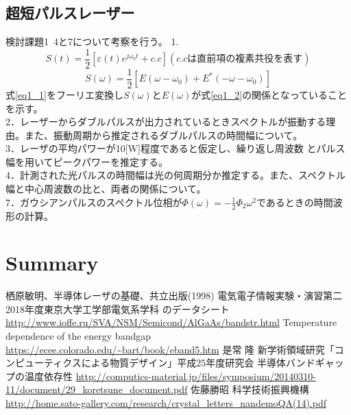 \documentclass[titlepage]{jsarticle}
\begin{document}
\subsection{超短パルスレーザー}
検討課題1~4と7について考察を行う。
1.
\begin{equation}
    S(t)=\frac{1}{2}[\varepsilon(t)e^{j\omega_0 t}+c.c](c.cは直前項の複素共役を表す)
    \label{eq1_1}
\end{equation}
\begin{equation}
    S(\omega)=\frac{1}{2}[E(\omega-\omega_0)+E^{*}(-\omega-\omega_0)]
    \label{eq1_2}
\end{equation}
式\ref{eq1_1}をフーリエ変換し$S(\omega)とE(\omega)$が式\ref{eq1_2}の関係となっていることを示す。\\
2．レーザーからダブルパルスが出力されているときスペクトルが振動する理由。また、振動周期から推定されるダブルパルスの時間幅について。\\
3．レーザの平均パワーが10[W]程度であると仮定し、繰り返し周波数
とパルス幅を用いてピークパワーを推定する。\\
4．計測された光パルスの時間幅は光の何周期分か推定する。また、スペクトル幅と中心周波数の比と、両者の関係について。\\
7．ガウシアンパルスのスペクトル位相が$\Phi(\omega)=-\frac{1}{2}\Phi_2\omega^2$であるときの時間波形の計算。\\


\section{Summary}


\begin{thebibliography}{9}
  栖原敏明、半導体レーザの基礎、共立出版(1998)
  電気電子情報実験・演習第二　2018年度東京大学工学部電気系学科
  のデータシート\url{http://www.ioffe.ru/SVA/NSM/Semicond/AlGaAs/bandstr.html}
   Temperature dependence of the energy bandgap　\url{https://ecee.colorado.edu/~bart/book/eband5.htm}
   是常 隆 新学術領域研究「コンピューティクスによる物質デザイン」平成25年度研究会 半導体バンドギャップの温度依存性  \url{http://computics-material.jp/files/symposium/20140310-11/document/29_koretsune_document.pdf}
   佐藤勝昭 科学技術振興機構 \url{http://home.sato-gallery.com/research/crystal_letters_nandemoQA(14).pdf}
\end{thebibliography}
\end{document}
